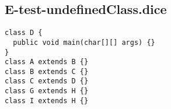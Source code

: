 \subsection{E-test-undefinedClass.dice}
\begin{verbatim}
class D {
  public void main(char[][] args) {}
}
class A extends B {}
class B extends C {}
class C extends D {}
class G extends H {}
class I extends H {}
\end{verbatim}